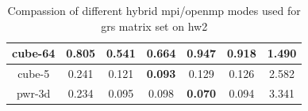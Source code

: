 \begin{table}[h!]
\begin{tabular}{|c|c|c|c|c|c|c|}
cube-64                                               & 0.805                                                     & \textbf{0.541}                                             & 0.664                                                     & 0.947                                                      & 0.918                                                      & 1.490                                                            \\ \hline
cube-5                                                & 0.241                                                     & 0.121                                                      & \textbf{0.093}                                            & 0.129                                                      & 0.126                                                      & 2.582                                                            \\ \hline
pwr-3d                                                & 0.234                                                     & 0.095                                                      & 0.098                                                     & \textbf{0.070}                                             & 0.094                                                      & 3.341                                                            \\ \hline
\end{tabular}
\caption{Compassion of different hybrid \gls{mpi}/\gls{openmp} modes used for \gls{grs} matrix set on \gls{hw2}}
\label{fig:mpi-omp-grs-hw2}
\end{table}


